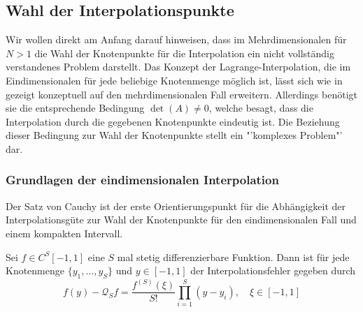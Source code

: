 \subsection{Wahl der Interpolationspunkte}
\label{chapter:interpolation_points}
Wir wollen direkt am Anfang darauf hinweisen, dass im Mehrdimensionalen für $N>1$ die Wahl der Knotenpunkte für die Interpolation ein nicht vollständig verstandenes Problem darstellt. Das Konzept der Lagrange-Interpolation, die im Eindimensionalen für jede beliebige Knotenmenge möglich ist, lässt sich wie in \autocite{San07} gezeigt konzeptuell auf den mehrdimensionalen Fall erweitern. Allerdings benötigt sie die entsprechende Bedingung $\det(A)\neq 0$, welche besagt, dass die Interpolation durch die gegebenen Knotenpunkte eindeutig ist. Die Beziehung dieser Bedingung zur Wahl der Knotenpunkte stellt ein "'komplexes Problem"' dar.
\subsubsection*{Grundlagen der eindimensionalen Interpolation}
Der Satz von Cauchy ist der erste Orientierungspunkt für die Abhängigkeit der Interpolationsgüte zur Wahl der Knotenpunkte für den eindimensionalen Fall und einem kompakten Intervall.
\begin{maththeorem}[Cauchy]
Sei $f\in C^{S}[-1,1]$ eine $S$ mal stetig differenzierbare Funktion. Dann ist für jede Knotenmenge $\lbrace y_1,\dots,y_{S}\rbrace$ und $y\in[-1,1]$ der Interpolationsfehler gegeben durch
\[f(y)-\mathcal{Q}_{S}f=\frac{f^{(S)}(\xi)}{S!}\prod_{i=1}^{S}(y-y_i),\quad \xi\in [-1,1]\]
\end{maththeorem}

